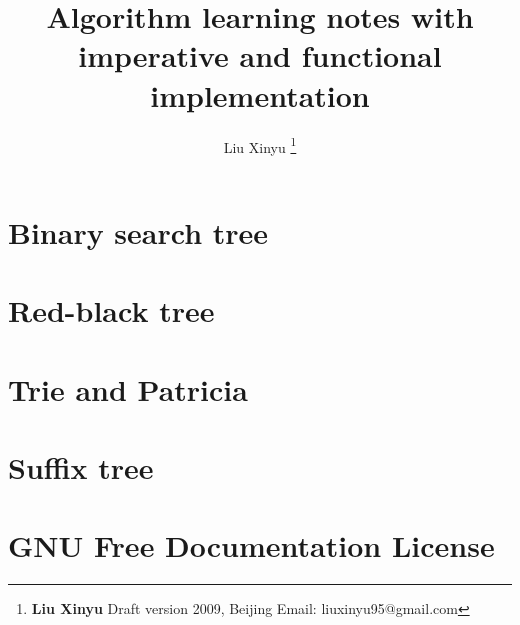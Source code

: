 \documentclass[a4paper,twoside]{book} %
\begin{document}


\title{{\bf \Huge Algorithm} learning notes \newline
            with imperative and functional implementation \newline
            \newline
            }

\author{Liu Xinyu
  \thanks{{\bfseries Liu Xinyu } \newline
    Draft version 2009, Beijing \newline
    Email: liuxinyu95@gmail.com \newline
    }}

\maketitle

%
\tableofcontents
\newpage

\part{Binary search tree}


\part{Red-black tree}


\part{Trie and Patricia}


\part{Suffix tree}


\part{GNU Free Documentation License}

\end{document}
